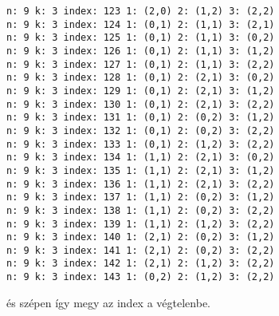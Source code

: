 \documentclass[a4paper]{article}
\begin{document}
\begin{lstlisting}[breaklines]
n: 9 k: 3 index: 123 1: (2,0) 2: (1,2) 3: (2,2)
n: 9 k: 3 index: 124 1: (0,1) 2: (1,1) 3: (2,1)
n: 9 k: 3 index: 125 1: (0,1) 2: (1,1) 3: (0,2)
n: 9 k: 3 index: 126 1: (0,1) 2: (1,1) 3: (1,2)
n: 9 k: 3 index: 127 1: (0,1) 2: (1,1) 3: (2,2)
n: 9 k: 3 index: 128 1: (0,1) 2: (2,1) 3: (0,2)
n: 9 k: 3 index: 129 1: (0,1) 2: (2,1) 3: (1,2)
n: 9 k: 3 index: 130 1: (0,1) 2: (2,1) 3: (2,2)
n: 9 k: 3 index: 131 1: (0,1) 2: (0,2) 3: (1,2)
n: 9 k: 3 index: 132 1: (0,1) 2: (0,2) 3: (2,2)
n: 9 k: 3 index: 133 1: (0,1) 2: (1,2) 3: (2,2)
n: 9 k: 3 index: 134 1: (1,1) 2: (2,1) 3: (0,2)
n: 9 k: 3 index: 135 1: (1,1) 2: (2,1) 3: (1,2)
n: 9 k: 3 index: 136 1: (1,1) 2: (2,1) 3: (2,2)
n: 9 k: 3 index: 137 1: (1,1) 2: (0,2) 3: (1,2)
n: 9 k: 3 index: 138 1: (1,1) 2: (0,2) 3: (2,2)
n: 9 k: 3 index: 139 1: (1,1) 2: (1,2) 3: (2,2)
n: 9 k: 3 index: 140 1: (2,1) 2: (0,2) 3: (1,2)
n: 9 k: 3 index: 141 1: (2,1) 2: (0,2) 3: (2,2)
n: 9 k: 3 index: 142 1: (2,1) 2: (1,2) 3: (2,2)
n: 9 k: 3 index: 143 1: (0,2) 2: (1,2) 3: (2,2)
\end{lstlisting}

és szépen így megy az index a végtelenbe.
\end{document}
